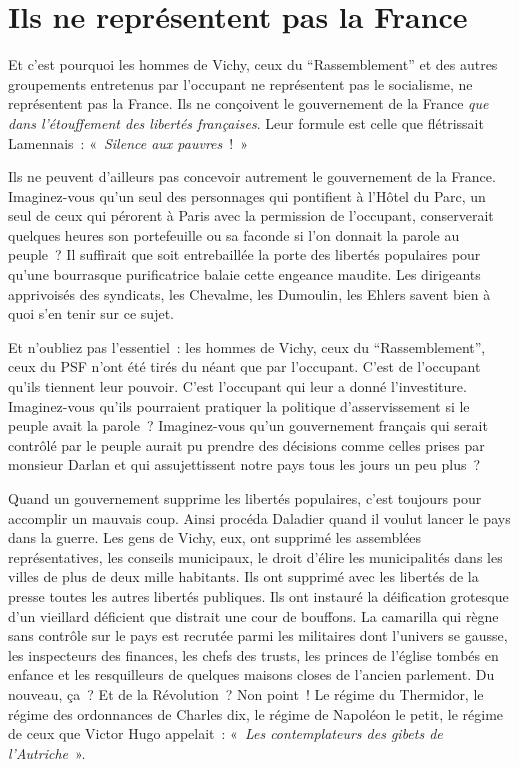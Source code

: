\documentclass[french,twoside]{book} %
\begin{document}
\section[{Ils ne représentent pas la France}]{Ils ne représentent pas la France}
\noindent Et c’est pourquoi les hommes de Vichy, ceux du “Rassemblement” et des autres groupements entretenus par l’occupant ne représentent pas le socialisme, ne représentent pas la France. Ils ne conçoivent le gouvernement de la France \emph{que dans l’étouffement des libertés françaises}. Leur formule est celle que flétrissait Lamennais : « \emph{Silence aux pauvres} ! »\par
Ils ne peuvent d’ailleurs pas concevoir autrement le gouvernement de la France. Imaginez-vous qu’un seul des personnages qui pontifient à l’Hôtel du Parc, un seul de ceux qui pérorent à Paris avec la permission de l’occupant, conserverait quelques heures son portefeuille ou sa faconde si l’on donnait la parole au peuple ? Il suffirait que soit entrebaillée la porte des libertés populaires pour qu’une bourrasque purificatrice balaie cette engeance maudite. Les dirigeants apprivoisés des syndicats, les Chevalme, les Dumoulin, les Ehlers savent bien à quoi s’en tenir sur ce sujet.\par
Et n’oubliez pas l’essentiel : les hommes de Vichy, ceux du “Rassemblement”, ceux du PSF n’ont été tirés du néant que par l’occupant. C’est de l’occupant qu’ils tiennent leur pouvoir. C’est l’occupant qui leur a donné l’investiture. Imaginez-vous qu’ils pourraient pratiquer la politique d’asservissement si le peuple avait la parole ? Imaginez-vous qu’un gouvernement français qui serait contrôlé par le peuple aurait pu prendre des décisions comme celles prises par monsieur Darlan et qui assujettissent notre pays tous les jours un peu plus ?\par
Quand un gouvernement supprime les libertés populaires, c’est toujours pour accomplir un mauvais coup. Ainsi procéda Daladier quand il voulut lancer le pays dans la guerre. Les gens de Vichy, eux, ont supprimé les assemblées représentatives, les conseils municipaux, le droit d’élire les municipalités dans les villes de plus de deux mille habitants. Ils ont supprimé avec les libertés de la presse toutes les autres libertés publiques. Ils ont instauré la déification grotesque d’un vieillard déficient que distrait une cour de bouffons. La camarilla qui règne sans contrôle sur le pays est recrutée parmi les militaires dont l’univers se gausse, les inspecteurs des finances, les chefs des trusts, les princes de l’église tombés en enfance et les resquilleurs de quelques maisons closes de l’ancien parlement. Du nouveau, ça ? Et de la Révolution ? Non point ! Le régime du Thermidor, le régime des ordonnances de Charles dix, le régime de Napoléon le petit, le régime de ceux que Victor Hugo appelait : « \emph{Les contemplateurs des gibets de l’Autriche} ».
\end{document}
